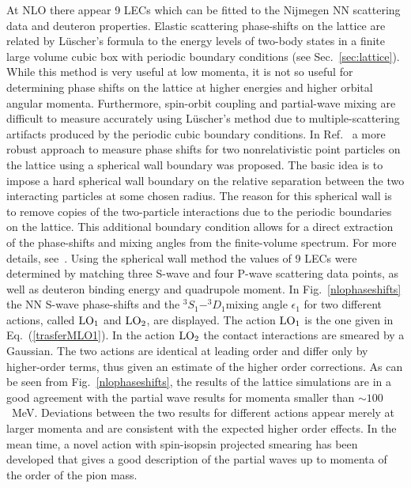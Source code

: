\documentclass[aps,rmp,nofootinbib,twocolumn,floatfix]{revtex4}
\begin{document}
At NLO there appear 9 LECs which can be fitted to the
Nijmegen NN scattering data and deuteron properties. 
Elastic scattering phase-shifts on the lattice are related by L\"uscher's 
formula to the energy levels of two-body
states in a finite large volume cubic box with periodic boundary
conditions (see Sec.~\ref{sec:lattice}). While this method is very useful 
at low momenta, it is not so useful for determining phase shifts on the
lattice at higher energies and
higher orbital angular momenta. Furthermore, spin-orbit coupling and
partial-wave mixing are difficult to measure accurately using L\"uscher's
method due to multiple-scattering artifacts produced by the periodic cubic
boundary conditions. In Ref.~\cite{Borasoy:2007vy} a more robust
approach to measure phase shifts for two nonrelativistic point particles
on the lattice using a spherical wall boundary was proposed. The basic idea 
is to impose a hard spherical wall boundary on the relative separation 
between the two interacting particles at some chosen radius. The reason for
this spherical wall is to remove copies of the two-particle interactions
due to the periodic boundaries on the lattice. This additional boundary condition 
allows for a direct extraction of the phase-shifts and mixing angles from the 
finite-volume spectrum. For more details, see~\cite{Borasoy:2007vy}.
Using the spherical wall method  the values of 9 LECs were determined by matching
three S-wave and four P-wave scattering data points, as well as deuteron binding
energy and quadrupole moment. In Fig.~\ref{nlophaseshifts} the NN S-wave phase-shifts and
the $^3S_1-^3D_1$mixing angle $\epsilon_1$ for two different actions, 
called ${\rm LO}_1$ and ${\rm LO}_2$,
are displayed. The action ${\rm LO}_1$ is the one given in
Eq.~(\ref{trasferMLO1}).  In the action  ${\rm LO}_2$ the contact interactions 
are smeared by a Gaussian. The two actions are identical at  leading order and 
differ only by higher-order terms, thus given an estimate of the higher order
corrections.
As can be seen from Fig.~\ref{nlophaseshifts}, the results of the lattice simulations
are in a good agreement with the partial wave results for momenta smaller than
$\sim 100$~MeV. Deviations between the two results for different actions appear
merely at larger momenta and are consistent with the expected higher order effects.
In the mean time, a novel action with spin-isopsin projected smearing has been
developed that gives a good description of the partial waves up to momenta
of the order of the pion mass.
\end{document}
